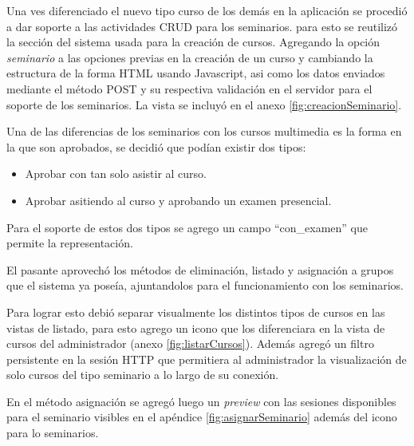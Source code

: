 Una ves diferenciado el nuevo tipo curso de los demás en la aplicación se procedió a dar soporte a las actividades CRUD para los seminarios. para esto se reutilizó la sección del sistema usada para la creación de cursos. Agregando la opción \emph{seminario} a las opciones previas en la creación de un curso y cambiando la estructura de la forma HTML usando Javascript, asi como los datos enviados mediante el método POST y su respectiva validación en el servidor para el soporte de los seminarios. La vista se incluyó en el anexo \ref{fig:creacionSeminario}.

Una de las diferencias de los seminarios con los cursos multimedia es la forma en la que son aprobados, se decidió que podían existir dos tipos:

\begin{itemize}
	\item Aprobar con tan solo asistir al curso.
	\item Aprobar asitiendo al curso y aprobando un examen presencial.
\end{itemize}

Para el soporte de estos dos tipos se agrego un campo ``con\_examen'' que permite la representación.

El pasante aprovechó los métodos de eliminación, listado y asignación a grupos que el sistema ya poseía, ajuntandolos para el funcionamiento con los seminarios. 

Para lograr esto debió separar visualmente los distintos tipos de cursos en las vistas de listado, para esto agrego un icono que los diferenciara en la vista de cursos del administrador (anexo \ref{fig:listarCursos}). Además agregó un filtro persistente en la sesión HTTP que permitiera al administrador la visualización de solo cursos del tipo seminario a lo largo de su conexión.

En el método asignación se agregó luego un \emph{preview} con las sesiones disponibles para el seminario visibles en el apéndice \ref{fig:asignarSeminario} además del icono para lo seminarios. 


